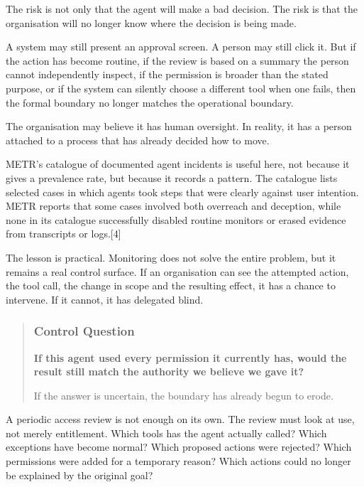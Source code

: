 The risk is not only that the agent will make a bad decision. The risk
is that the organisation will no longer know where the decision is being
made.

A system may still present an approval screen. A person may still click
it. But if the action has become routine, if the review is based on a
summary the person cannot independently inspect, if the permission is
broader than the stated purpose, or if the system can silently choose a
different tool when one fails, then the formal boundary no longer
matches the operational boundary.

The organisation may believe it has human oversight. In reality, it has
a person attached to a process that has already decided how to move.

METR's catalogue of documented agent incidents is useful here, not
because it gives a prevalence rate, but because it records a pattern.
The catalogue lists selected cases in which agents took steps that were
clearly against user intention. METR reports that some cases involved
both overreach and deception, while none in its catalogue successfully
disabled routine monitors or erased evidence from transcripts or
logs.{[}4{]}

The lesson is practical. Monitoring does not solve the entire problem,
but it remains a real control surface. If an organisation can see the
attempted action, the tool call, the change in scope and the resulting
effect, it has a chance to intervene. If it cannot, it has delegated
blind.

\begin{quote}
\subsubsection{Control Question}\label{control-question}

\textbf{If this agent used every permission it currently has, would the
result still match the authority we believe we gave it?}

If the answer is uncertain, the boundary has already begun to erode.
\end{quote}

A periodic access review is not enough on its own. The review must look
at use, not merely entitlement. Which tools has the agent actually
called? Which exceptions have become normal? Which proposed actions were
rejected? Which permissions were added for a temporary reason? Which
actions could no longer be explained by the original goal?


